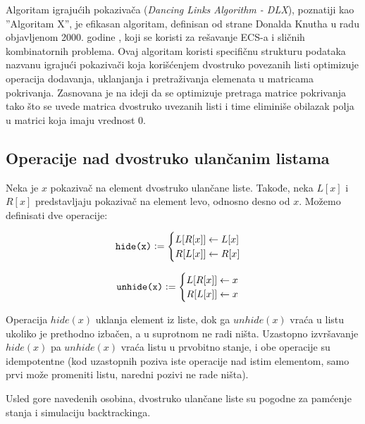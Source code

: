 \documentclass[a4paper]{article}
\begin{document}
{Algoritam igrajućih pokazivača ({\em Dancing Links Algorithm - DLX}), poznatiji kao ''Algoritam X'', je
efikasan algoritam, definisan od strane Donalda Knutha u radu objavljenom 2000. godine \cite{knuth},
koji se koristi za rešavanje ECS-a i sličnih kombinatornih problema. Ovaj algoritam koristi specifičnu
strukturu podataka nazvanu igrajući  pokazivači koja korišćenjem dvostruko povezanih listi optimizuje
operacija dodavanja, uklanjanja i pretraživanja elemenata u matricama pokrivanja. Zasnovana je na ideji
da se optimizuje pretraga matrice pokrivanja tako što se uvede matrica dvostruko uvezanih listi i time
eliminiše obilazak polja u matrici koja imaju vrednost \( 0 \).

\subsection{Operacije nad dvostruko ulančanim listama}

Neka je \( x \) pokazivač na element dvostruko ulančane liste. Takođe, neka \( L[x] \) i \( R[x] \)
predstavljaju pokazivač na element levo, odnosno desno od \( x \). Možemo definisati dve operacije:

\begin{minipage}{0.45\textwidth}
  \[
  \texttt{hide(x)} \vcentcolon =
  \begin{cases}
    L[R[x]] \gets L[x] \\
    R[L[x]] \gets R[x]
  \end{cases}
  \]
\end{minipage}
\begin{minipage}{0.45\textwidth}
  \[
  \texttt{unhide(x)} \vcentcolon =
  \begin{cases}
    L[R[x]] \gets x \\
    R[L[x]] \gets x
  \end{cases}
  \]
\end{minipage}


Operacija \( hide(x) \) uklanja element iz liste, dok ga \( unhide(x) \) vraća u listu ukoliko
je prethodno izbačen, a u suprotnom ne radi ništa. Uzastopno izvršavanje \( hide(x) \) pa \( unhide(x) \)
vraća listu u prvobitno stanje, i obe operacije su idempotentne (kod uzastopnih poziva iste operacije nad
istim elementom, samo prvi može promeniti listu, naredni pozivi ne rade ništa).

Usled gore navedenih osobina, dvostruko ulančane liste su pogodne za pamćenje stanja i simulaciju backtrackinga.

}
\end{document}
